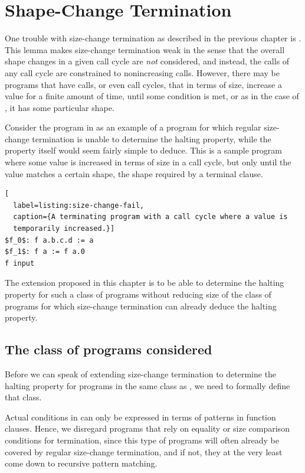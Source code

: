 \chapter{Shape-Change Termination}

One trouble with size-change termination as described in the previous chapter
is . This lemma makes size-change termination weak
in the sense that the overall shape changes in a given call cycle are
\emph{not} considered, and instead, the calls of any call cycle are constrained
to nonincreasing calls. However, there may be programs that have calls, or even
call cycles, that in terms of size, increase a value for a finite amount of
time, until some condition is met, or as in the case of \D{}, it has some
particular shape.

Consider the program in  as an example of a
program for which regular size-change termination is unable to determine the
halting property, while the property itself would seem fairly simple to deduce.
This is a sample program where some value is increased in terms of size in a
call cycle, but only until the value matches a certain shape, the shape
required by a terminal clause.

\begin{lstlisting}[
  label=listing:size-change-fail,
  caption={A terminating program with a call cycle where a value is
  temporarily increased.}]
$f_0$: f a.b.c.d := a
$f_1$: f a := f a.0
f input
\end{lstlisting}

The extension proposed in this chapter is to be able to determine the halting
property for such a class of programs without reducing size of the class of
programs for which size-change termination can already deduce the halting
property.

\section{The class of programs considered}

Before we can speak of extending size-change termination to determine the
halting property for programs in the same class as
, we need to formally define that class.

Actual conditions in \D{} can only be expressed in terms of patterns in
function clauses. Hence, we disregard programs that rely on equality or size
comparison conditions for termination, since this type of programs will often
already be covered by regular size-change termination, and if not, they at the
very least come down to recursive pattern matching.

